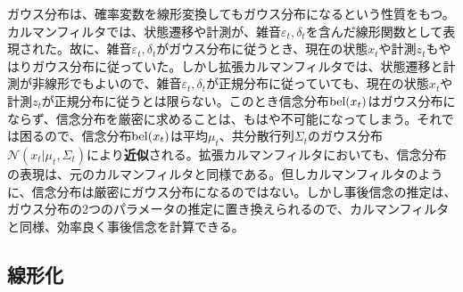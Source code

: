 \documentclass[dvipdfmx,a4paper]{jsarticle}
\begin{document}
ガウス分布は、確率変数を線形変換してもガウス分布になるという性質をもつ。カルマンフィルタでは、状態遷移や計測が、雑音$\varepsilon_t, \delta_t$を含んだ線形関数として表現された。故に、雑音$\varepsilon_t, \delta_t$がガウス分布に従うとき、現在の状態$x_t$や計測$z_t$もやはりガウス分布に従っていた。しかし拡張カルマンフィルタでは、状態遷移と計測が非線形でもよいので、雑音$\varepsilon_t, \delta_t$が正規分布に従っていても、現在の状態$x_t$や計測$z_t$が正規分布に従うとは限らない。このとき信念分布$\operatorname{bel}(x_t)$はガウス分布にならず、信念分布を厳密に求めることは、もはや不可能になってしまう。それでは困るので、信念分布$\operatorname{bel}(x_t)$は平均$\mu_t$、共分散行列$\Sigma_t$のガウス分布$\mathcal{N}(x_t | \mu_t, \Sigma_t)$により\textbf{近似}される。拡張カルマンフィルタにおいても、信念分布の表現は、元のカルマンフィルタと同様である。但しカルマンフィルタのように、信念分布は厳密にガウス分布になるのではない。しかし事後信念の推定は、ガウス分布の2つのパラメータの推定に置き換えられるので、カルマンフィルタと同様、効率良く事後信念を計算できる。

\subsection{線形化}
\end{document}
